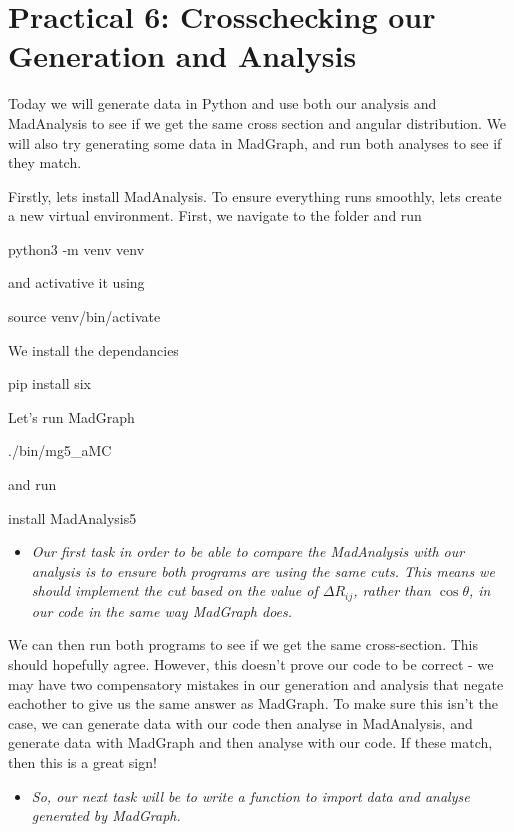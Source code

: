 \section*{Practical 6: Crosschecking our Generation and Analysis}

Today we will generate data in Python and use both our analysis and MadAnalysis to see if we get the same cross section and angular distribution. We will also try generating some data in MadGraph, and run both analyses to see if they match.

Firstly, lets install MadAnalysis. To ensure everything runs smoothly, lets create a new virtual environment. First, we navigate to the  folder and run
\begin{codeenv}
 python3 -m venv venv
 \end{codeenv}
and activative it using
\begin{codeenv}
     source venv/bin/activate
\end{codeenv}
We install the dependancies
\begin{codeenv}
    pip install six
\end{codeenv}

Let's run MadGraph
\begin{codeenv}
    ./bin/mg5_aMC
\end{codeenv}
and run
\begin{codeenv}
    install MadAnalysis5 
\end{codeenv}

\begin{itemize}
    \item \textit{Our first task in order to be able to compare the MadAnalysis with our analysis is to ensure both programs are using the same cuts. This means we should implement the cut based on the value of $\Delta R_{ij}$, rather than $\cos\theta$, in our code in the same way MadGraph does.}
\end{itemize}

We can then run both programs to see if we get the same cross-section. This should hopefully agree. However, this doesn't prove our code to be correct - we may have two compensatory mistakes in our generation and analysis that negate eachother to give us the same answer as MadGraph. To make sure this isn't the case, we can generate data with our code then analyse in MadAnalysis, and generate data with MadGraph and then analyse with our code. If these match, then this is a great sign!

\begin{itemize}
    \item \textit{So, our next task will be to write a function to import data and analyse generated by MadGraph.}
\end{itemize}

